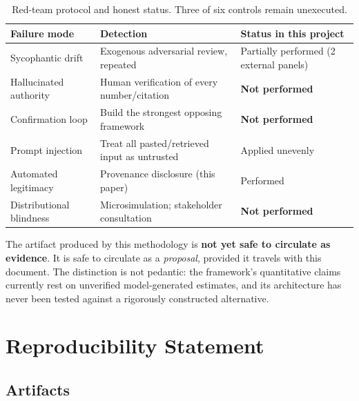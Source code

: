 \documentclass[11pt,a4paper]{article}
\begin{document}
\begin{table}[h!]
\centering
\small
\begin{tabular}{@{}p{3.3cm}p{5.0cm}p{5.6cm}@{}}
\toprule
\textbf{Failure mode} & \textbf{Detection} & \textbf{Status in this project} \\
\midrule
Sycophantic drift & Exogenous adversarial review, repeated & Partially performed (2 external panels) \\
Hallucinated authority & Human verification of every number/citation & \textbf{Not performed} \\
Confirmation loop & Build the strongest opposing framework & \textbf{Not performed} \\
Prompt injection & Treat all pasted/retrieved input as untrusted & Applied unevenly \\
Automated legitimacy & Provenance disclosure (this paper) & Performed \\
Distributional blindness & Microsimulation; stakeholder consultation & \textbf{Not performed} \\
\bottomrule
\end{tabular}
\caption{Red-team protocol and honest status. Three of six controls remain unexecuted.}
\label{tab:redteam}
\end{table}

\begin{tcolorbox}[keybox, title=Summary Judgment of the Red Team]
The artifact produced by this methodology is \textbf{not yet safe to circulate as evidence}. It is safe to circulate as a \emph{proposal}, provided it travels with this document. The distinction is not pedantic: the framework's quantitative claims currently rest on unverified model-generated estimates, and its architecture has never been tested against a rigorously constructed alternative.
\end{tcolorbox}

\section{Reproducibility Statement}
\label{sec:repro}

\subsection{Artifacts}
\end{document}
